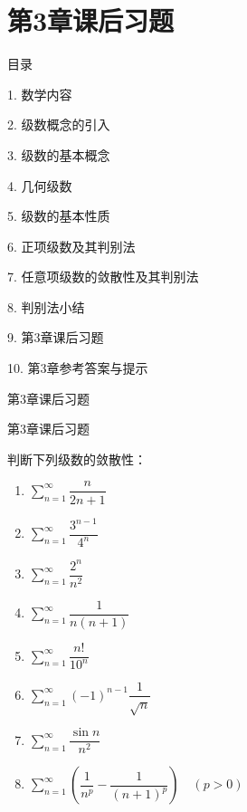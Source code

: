 \documentclass[aspectratio=169,10pt,fontset=fandol]{ctexbeamer}
\begin{document}
\section{第3章课后习题}
\begin{frame}[t,fragile]{目录}
\normalsize
{\color{black}\normalsize 1. 数学内容\par}\vspace{0.3em}
{\color{black}\normalsize 2. 级数概念的引入\par}\vspace{0.3em}
{\color{black}\normalsize 3. 级数的基本概念\par}\vspace{0.3em}
{\color{black}\normalsize 4. 几何级数\par}\vspace{0.3em}
{\color{black}\normalsize 5. 级数的基本性质\par}\vspace{0.3em}
{\color{black}\normalsize 6. 正项级数及其判别法\par}\vspace{0.3em}
{\color{black}\normalsize 7. 任意项级数的敛散性及其判别法\par}\vspace{0.3em}
{\color{black}\normalsize 8. 判别法小结\par}\vspace{0.3em}
{\color{blue}\normalsize 9. 第3章课后习题\par}\vspace{0.3em}
{\color{gray!40}\normalsize 10. 第3章参考答案与提示\par}\vspace{0.3em}
\end{frame}
\begin{frame}[t,fragile]{第3章课后习题}
\footnotesize
{\footnotesize


}
\end{frame}
\begin{frame}[t,fragile]{第3章课后习题}
\footnotesize
{\footnotesize

判断下列级数的敛散性：

\begin{enumerate}
\item \(\sum_{n=1}^{\infty} \dfrac{n}{2n+1}\)
\item \(\sum_{n=1}^{\infty} \dfrac{3^{n-1}}{4^n}\)
\item \(\sum_{n=1}^{\infty} \dfrac{2^n}{n^2}\)
\item \(\sum_{n=1}^{\infty} \dfrac{1}{n(n+1)}\)
\item \(\sum_{n=1}^{\infty} \dfrac{n!}{10^n}\)
\item \(\sum_{n=1}^{\infty} (-1)^{n-1} \dfrac{1}{\sqrt{n}}\)
\item \(\sum_{n=1}^{\infty} \dfrac{\sin n}{n^2}\)
\item \(\sum_{n=1}^{\infty} \left(\dfrac{1}{n^p} - \dfrac{1}{(n+1)^p}\right) \quad (p>0)\)
\end{enumerate}

}
\end{frame}
\end{document}
